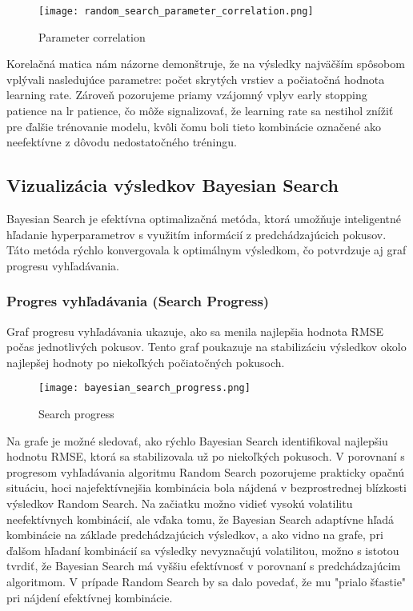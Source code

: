 \begin{figure}[ht!]
\centering
\texttt{[image: random\_search\_parameter\_correlation.png]}
\caption{Parameter correlation}
\label{fig:random_search_parameter_correlation}
\end{figure}

Korelačná matica nám názorne demonštruje, že na výsledky najväčším spôsobom vplývali nasledujúce parametre: počet skrytých vrstiev a počiatočná hodnota learning rate. Zároveň pozorujeme priamy vzájomný vplyv early stopping patience na lr patience, čo môže signalizovať, že learning rate sa nestihol znížiť pre ďalšie trénovanie modelu, kvôli čomu boli tieto kombinácie označené ako neefektívne z dôvodu nedostatočného tréningu.

\subsection{Vizualizácia výsledkov Bayesian Search}

Bayesian Search je efektívna optimalizačná metóda, ktorá umožňuje inteligentné hľadanie hyperparametrov s využitím informácií z predchádzajúcich pokusov. Táto metóda rýchlo konvergovala k optimálnym výsledkom, čo potvrdzuje aj graf progresu vyhľadávania.

\subsubsection{Progres vyhľadávania (Search Progress)}
Graf progresu vyhľadávania ukazuje, ako sa menila najlepšia hodnota RMSE počas jednotlivých pokusov. Tento graf poukazuje na stabilizáciu výsledkov okolo najlepšej hodnoty po niekoľkých počiatočných pokusoch. 

\begin{figure}[ht!]
\centering
\texttt{[image: bayesian\_search\_progress.png]}
\caption{Search progress}
\label{fig:bayesian_search_progress}
\end{figure}

Na grafe je možné sledovať, ako rýchlo Bayesian Search identifikoval najlepšiu hodnotu RMSE, ktorá sa stabilizovala už po niekoľkých pokusoch. V porovnaní s progresom vyhľadávania algoritmu Random Search pozorujeme prakticky opačnú situáciu, hoci najefektívnejšia kombinácia bola nájdená v bezprostrednej blízkosti výsledkov Random Search. Na začiatku možno vidieť vysokú volatilitu neefektívnych kombinácií, ale vďaka tomu, že Bayesian Search adaptívne hľadá kombinácie na základe predchádzajúcich výsledkov, a ako vidno na grafe, pri ďalšom hľadaní kombinácií sa výsledky nevyznačujú volatilitou, možno s istotou tvrdiť, že Bayesian Search má vyššiu efektívnosť v porovnaní s predchádzajúcim algoritmom. V prípade Random Search by sa dalo povedať, že mu "prialo šťastie" pri nájdení efektívnej kombinácie.

